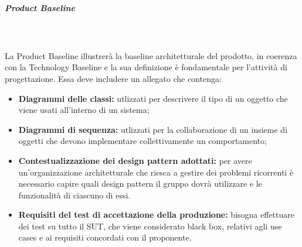 \subparagraph{Product Baseline}\mbox{}\\ \\
La Product Baseline illustrerà la baseline architetturale del prodotto, in coerenza con la Technology Baseline e la sua definizione è fondamentale per l'attività di progettazione.
Essa deve includere un allegato che contenga:
\begin{itemize}
	\item \textbf{Diagrammi delle classi:} utlizzati per descrivere il tipo di un oggetto che viene usati all'interno di un sistema;
	\item \textbf{Diagrammi di sequenza:} utlizzati per la collaborazione di un insieme di oggetti che devono implementare collettivamente un comportamento;
	\item \textbf{Contestualizzazione dei design pattern adottati:} per avere un'organizzazione architetturale che riesca a gestire dei problemi ricorrenti è necessario capire quali design pattern il gruppo dovrà utilizzare e le funzionalità di ciascuno di essi.	
	\item \textbf{Requisiti del test di accettazione della produzione:} bisogna effettuare dei test su tutto il SUT, che viene considerato black box, relativi agli use cases e ai requisiti concordati con il proponente.
\end{itemize}